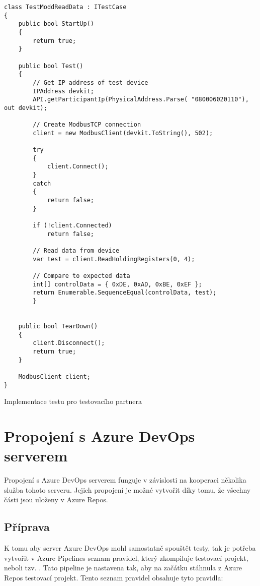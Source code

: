 \begin{listing}[htbp]
    \centering
    \begin{verbatim}
class TestModdReadData : ITestCase
{
    public bool StartUp()
    {
        return true;
    }

    public bool Test()
    {
        // Get IP address of test device
        IPAddress devkit;
        API.getParticipantIp(PhysicalAddress.Parse( "080006020110"), out devkit);

        // Create ModbusTCP connection
        client = new ModbusClient(devkit.ToString(), 502);

        try 
        {
            client.Connect();
        }
        catch 
        {
            return false;
        }

        if (!client.Connected)
            return false;

        // Read data from device
        var test = client.ReadHoldingRegisters(0, 4);
            
        // Compare to expected data
        int[] controlData = { 0xDE, 0xAD, 0xBE, 0xEF };
        return Enumerable.SequenceEqual(controlData, test);
        }


    public bool TearDown()
    {
        client.Disconnect();
        return true;
    }

    ModbusClient client;
}
    \end{verbatim}
\caption{Implementace testu pro testovacího partnera}
\label{listing:testcase_partner}
\end{listing}


\section{Propojení s Azure DevOps serverem}
Propojení s Azure DevOps serverem funguje v závislosti na kooperaci několika služba tohoto serveru. Jejich propojení je možné vytvořit díky tomu, že všechny části jsou uloženy v Azure Repos. 

\subsection{Příprava}
K tomu aby server Azure DevOps mohl samostatně spouštět testy, tak je potřeba vytvořit v Azure Pipelines seznam pravidel, který zkompiluje testovací projekt, neboli tzv. . Tato pipeline je nastavena tak, aby na začátku stáhnula z Azure Repos testovací projekt. Tento seznam pravidel obsahuje tyto pravidla:


